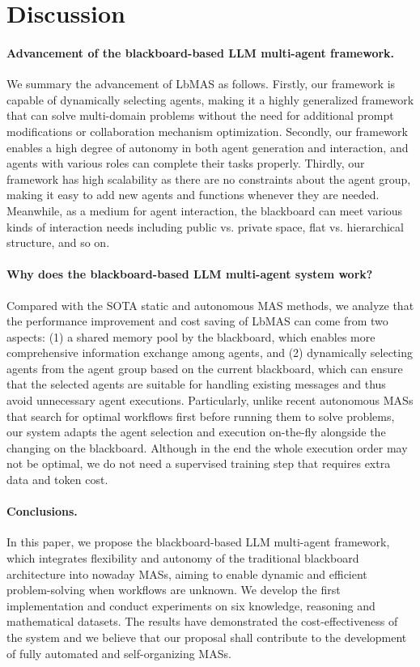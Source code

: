 \documentclass[11pt]{article}
\begin{document}
\section{Discussion}

\paragraph{Advancement of the blackboard-based LLM multi-agent framework.}
We summary the advancement of LbMAS as follows. Firstly, our framework is capable of dynamically selecting agents, making it a highly generalized framework that can solve multi-domain problems without the need for additional prompt modifications or collaboration mechanism optimization. Secondly, our framework enables a high degree of autonomy in both agent generation and interaction, and agents with various roles can complete their tasks properly. %
Thirdly, our framework has high scalability as there are no constraints about the agent group, making it easy to add new agents and functions whenever they are needed. Meanwhile, as a medium for agent interaction, the blackboard can meet various kinds of interaction needs including public vs. private space, flat vs. hierarchical structure, and so on. 

\paragraph{Why does the blackboard-based LLM multi-agent system work?}
Compared with the SOTA static and autonomous MAS methods, we analyze that the performance improvement and cost saving of LbMAS can come from two aspects: (1) a shared memory pool by the blackboard, which enables more comprehensive information exchange among agents, and (2) dynamically selecting agents from the agent group based on the current blackboard, which can ensure that the selected agents are suitable for handling existing messages and thus avoid unnecessary agent executions. Particularly, unlike recent autonomous MASs that search for optimal workflows first before running them to solve problems, our system adapts the agent selection and execution on-the-fly alongside the changing on the blackboard. Although in the end the whole execution order may not be optimal, we do not need a supervised training step that requires extra data and token cost. 

\paragraph{Conclusions.}
In this paper, we propose the blackboard-based LLM multi-agent framework, which integrates flexibility and autonomy of the traditional blackboard architecture into nowaday MASs, aiming to enable dynamic and efficient problem-solving when workflows are unknown. We develop the first implementation and conduct experiments on six knowledge, reasoning and mathematical datasets. The results have demonstrated the cost-effectiveness of the system and we believe that our proposal shall contribute to the development of fully automated and self-organizing MASs.
\end{document}
